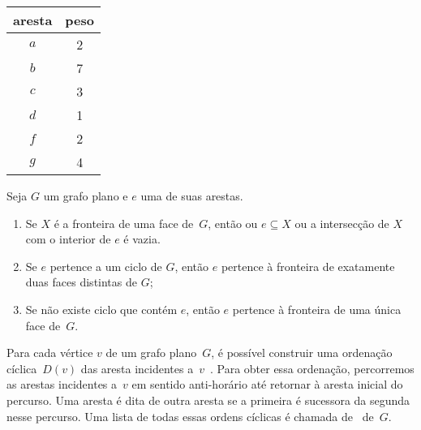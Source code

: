 \begin{minipage}[b]{0.4\textwidth}
\centering
\begin{tabular}{| c  c |} 
 \hline
 aresta & peso\\
 \hline
 $a$ & 2 \\ 
 \hline
$b$ & 7 \\
 \hline
$c$ & 3 \\
 \hline
$d$ & 1 \\
 \hline
$f$ & 2 \\
 \hline
$g$ & 4 \\
 \hline
\end{tabular}
\end{minipage}
\hfill
\begin{minipage}[b]{0.6\textwidth}
\scalebox{1.5}{
  \centering
  
  }
 \label{fig:MSF-basico-0}
\end{minipage}

\begin{lemma}
\label{lemma:diestel}
Seja $G$ um grafo plano e $e$ uma de suas arestas.
\begin{enumerate}
\item Se $X$ é a fronteira de uma face de~$G$, então ou $e\subseteq X$ ou a intersecção de $X$ com o interior de $e$ é vazia.
\item Se $e$ pertence a um ciclo de $G$, então $e$ pertence à fronteira de exatamente duas faces distintas de $G$;
\item Se não existe ciclo que contém $e$, então $e$ pertence à fronteira de uma única face de~$G$.
\end{enumerate}
\end{lemma}

Para cada vértice $v$ de um grafo plano~$G$, é possível construir uma ordenação cíclica~$D(v)$ das aresta incidentes a~$v$~\cite{noma2003}.
Para obter essa ordenação, percorremos as arestas incidentes a~$v$ em sentido anti-horário até retornar à aresta inicial do percurso.
Uma aresta é dita  de outra aresta se a primeira é sucessora da segunda nesse percurso.
Uma lista de todas essas ordens cíclicas é chamada de~ de~$G$.

